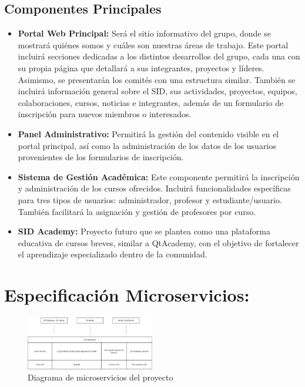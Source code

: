 \documentclass[11pt,a4paper]{article}
\begin{document}
\subsection{Componentes Principales}
\begin{itemize}
	\item \textbf{Portal Web Principal: } Será el sitio informativo del grupo, 
    donde se mostrará quiénes somos y cuáles son nuestras áreas de trabajo. Este portal incluirá secciones dedicadas a los distintos 
    desarrollos del grupo, cada una con su propia página que detallará a sus integrantes, proyectos y líderes. Asimismo, se presentarán los 
    comités con una estructura similar. 
    También se incluirá información general sobre el SID, sus actividades, proyectos, equipos, colaboraciones, cursos, noticias e integrantes, 
    además de un formulario de inscripción para nuevos miembros o interesados.

	\item \textbf{Panel Administrativo: } Permitirá la gestión del contenido visible en el portal principal, así como la administración de los datos de los usuarios provenientes de los formularios de inscripción.

	\item \textbf{Sistema de Gestión Académica: } Este componente permitirá la inscripción y administración de los cursos ofrecidos. Incluirá funcionalidades específicas para tres tipos de usuarios: administrador, profesor y estudiante/usuario. También facilitará la asignación y gestión de profesores por curso.

	\item \textbf{SID Academy: } Proyecto futuro que se plantea como una plataforma educativa de cursos breves, similar a QtAcademy, con el objetivo de fortalecer el aprendizaje especializado dentro de la comunidad.
\end{itemize}



\section{Especificación Microservicios:}

\begin{figure}[H]
	\centering
	\includegraphics[width=0.5\textwidth]{src/SID_microservices.pdf}
	\caption{Diagrama de microservicios del proyecto}
\end{figure}
\end{document}
